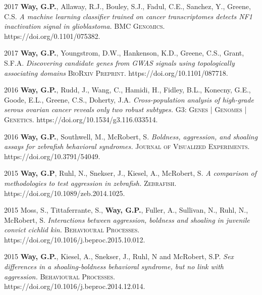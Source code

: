 
\begin{cvskills}

  \cvskill
    {2017} %
    {\textbf{Way, G.P.}, Allaway, R.J., Bouley, S.J., Fadul, C.E., Sanchez, Y.,
    Greene, C.S. \textit{A machine learning classifier trained on cancer
    transcriptomes detects NF1 inactivation signal in glioblastoma.}
    \textsc{BMC Genomics.} https://doi.org/0.1101/075382.}

    \cvskill
    {2017} %
    {\textbf{Way, G.P.}, Youngstrom, D.W., Hankenson, K.D., Greene, C.S., Grant,
    S.F.A. \textit{Discovering candidate genes from GWAS signals using
    topologically associating domains}
    \textsc{BioRxiv Preprint.} https://doi.org/10.1101/087718.}

    \cvskill
    {2016} %
    {\textbf{Way, G.P.}, Rudd, J., Wang, C., Hamidi, H., Fidley, B.L., Konecny,
    G.E., Goode, E.L., Greene, C.S., Doherty, J.A. \textit{Cross-population
    analysis of high-grade serous ovarian cancer reveals only two robust
    subtypes.} \textsc{G3: Genes | Genomes | Genetics.}
    https://doi.org/10.1534/g3.116.033514.}

    \cvskill
    {2016} %
    {\textbf{Way, G.P.}, Southwell, M., McRobert, S. \textit{Boldness,
    aggression, and shoaling assays for zebrafish behavioral syndromes.}
    \textsc{Journal of Visualized Experiments.} https://doi.org/10.3791/54049.}

    \cvskill
    {2015} %
    {\textbf{Way, G.P}, Ruhl, N., Snekser, J., Kiesel, A., McRobert, S.
    \textit{A comparison of methodologies to test aggression in zebrafish.}
    \textsc{Zebrafish.} https://doi.org/10.1089/zeb.2014.1025.}

    \cvskill
    {2015} %
    {Moss, S., Tittaferrante, S., \textbf{Way, G.P.}, Fuller, A., Sullivan, N.,
    Ruhl, N., McRobert, S. \textit{Interactions between aggression, boldness
    and shoaling in juvenile convict cichlid kin.} \textsc{Behavioural
    Processes.} https://doi.org/10.1016/j.beproc.2015.10.012.}

    \cvskill
    {2015} %
    {\textbf{Way, G.P.}, Kiesel, A., Snekser, J., Ruhl, N and McRobert, S.P.
    \textit{Sex differences in a shoaling-boldness behavioral syndrome, but no
    link with aggression.}
    \textsc{Behavioural Processes.}
    https://doi.org/10.1016/j.beproc.2014.12.014.}

\end{cvskills}
